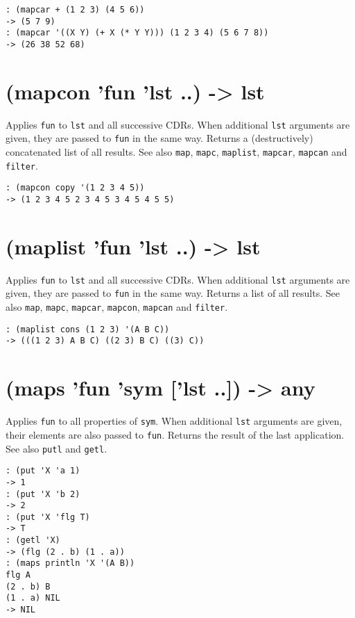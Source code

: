 {{{{{{{\begin{verbatim}
: (mapcar + (1 2 3) (4 5 6))
-> (5 7 9)
: (mapcar '((X Y) (+ X (* Y Y))) (1 2 3 4) (5 6 7 8))
-> (26 38 52 68)
\end{verbatim}

 
\section{(mapcon 'fun 'lst ..) -> lst}
\label{sec-8-1-13-12}


Applies \texttt{fun} to \texttt{lst} and all successive CDRs. When additional \texttt{lst}
arguments are given, they are passed to \texttt{fun} in the same way. Returns a
(destructively) concatenated list of all results. See also \texttt{map},
\texttt{mapc}, \texttt{maplist}, \texttt{mapcar}, \texttt{mapcan} and \texttt{filter}.


\begin{verbatim}
: (mapcon copy '(1 2 3 4 5))
-> (1 2 3 4 5 2 3 4 5 3 4 5 4 5 5)
\end{verbatim}

 
\section{(maplist 'fun 'lst ..) -> lst}
\label{sec-8-1-13-13}


Applies \texttt{fun} to \texttt{lst} and all successive CDRs. When additional \texttt{lst}
arguments are given, they are passed to \texttt{fun} in the same way. Returns a
list of all results. See also \texttt{map}, \texttt{mapc}, \texttt{mapcar}, \texttt{mapcon},
\texttt{mapcan} and \texttt{filter}.


\begin{verbatim}
: (maplist cons (1 2 3) '(A B C))
-> (((1 2 3) A B C) ((2 3) B C) ((3) C))
\end{verbatim}

 
\section{(maps 'fun 'sym ['lst ..]) -> any}
\label{sec-8-1-13-14}


Applies \texttt{fun} to all properties of \texttt{sym}. When additional \texttt{lst}
arguments are given, their elements are also passed to \texttt{fun}. Returns
the result of the last application. See also \texttt{putl} and \texttt{getl}.


\begin{verbatim}
: (put 'X 'a 1)
-> 1
: (put 'X 'b 2)
-> 2
: (put 'X 'flg T)
-> T
: (getl 'X)
-> (flg (2 . b) (1 . a))
: (maps println 'X '(A B))
flg A
(2 . b) B
(1 . a) NIL
-> NIL
\end{verbatim}

}}}}}}}
